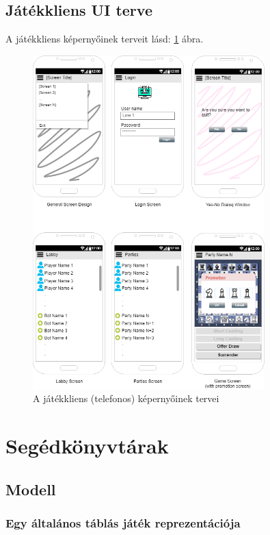 \documentclass[twoside, a4paper, 12pt]{article}
\begin{document}
\subsection{Játékkliens UI terve}
A játékkliens képernyőinek terveit lásd: \ref{fig:gameClientScreens} ábra.
\begin{figure}[htbp]
	\centering
	\includegraphics[width=0.8\textwidth]{img/gameClientScreens.png}
	\caption{A játékkliens (telefonos) képernyőinek tervei}
	\label{fig:gameClientScreens}
\end{figure}

\section{Segédkönyvtárak}

\subsection{Modell}

\subsubsection{Egy általános táblás játék reprezentációja}
\end{document}
